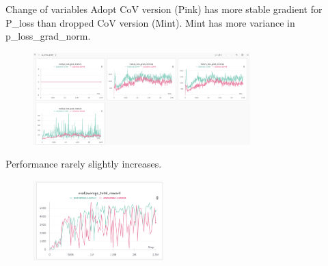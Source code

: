 \documentclass[8pt]{beamer}
\begin{document}
\begin{frame}{Change of variables}
    Adopt CoV version (Pink) has more stable gradient for P\_loss than dropped CoV version (Mint). Mint has more variance in p\_loss\_grad\_norm.
    \begin{figure}
        \includegraphics[width=0.75\textwidth]{MoreStablePLoss.png}
    \end{figure}

    Performance rarely slightly increases.
    \begin{figure}
        \includegraphics[width=0.45\textwidth]{CoVReturns.png}
    \end{figure}
\end{frame}

\end{document}
